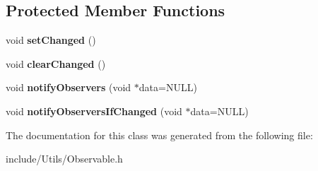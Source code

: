 \subsection*{Protected Member Functions}
\begin{DoxyCompactItemize}
\item 
\hypertarget{classCartWheel_1_1Util_1_1Observable_a8001364de946f94a3949f8a741048eb0}{
void {\bfseries setChanged} ()}
\label{classCartWheel_1_1Util_1_1Observable_a8001364de946f94a3949f8a741048eb0}

\item 
\hypertarget{classCartWheel_1_1Util_1_1Observable_a882e162f0d3ba6cebf136792468d37be}{
void {\bfseries clearChanged} ()}
\label{classCartWheel_1_1Util_1_1Observable_a882e162f0d3ba6cebf136792468d37be}

\item 
\hypertarget{classCartWheel_1_1Util_1_1Observable_a689bd38de6c5c3e694caf10931fc9738}{
void {\bfseries notifyObservers} (void $\ast$data=NULL)}
\label{classCartWheel_1_1Util_1_1Observable_a689bd38de6c5c3e694caf10931fc9738}

\item 
\hypertarget{classCartWheel_1_1Util_1_1Observable_ab9129fb68ca5aeb7499966a3611c53d8}{
void {\bfseries notifyObserversIfChanged} (void $\ast$data=NULL)}
\label{classCartWheel_1_1Util_1_1Observable_ab9129fb68ca5aeb7499966a3611c53d8}

\end{DoxyCompactItemize}


The documentation for this class was generated from the following file:\begin{DoxyCompactItemize}
\item 
include/Utils/Observable.h\end{DoxyCompactItemize}
